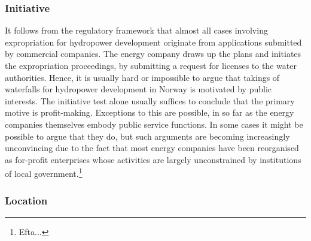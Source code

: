 \subsubsection{Initiative}

It follows from the regulatory framework that almost all cases involving expropriation for hydropower development originate from applications submitted by commercial companies. The energy company draws up the plans and initiates the expropriation proceedings, by submitting a request for licenses to the water authorities. Hence, it is usually hard or impossible to argue that takings of waterfalls for hydropower development in Norway is motivated by public interests. The initiative test alone usually suffices to conclude that the primary motive is profit-making. Exceptions to this are possible, in so far as the energy companies themselves embody public service functions. In some cases it might be possible to argue that they do, but such arguments are becoming increasingly unconvincing due to the fact that most energy companies have been reorganised as for-profit enterprises whose activities are largely unconstrained by institutions of local government.\footnote{Efta...}



\subsubsection{Location}

